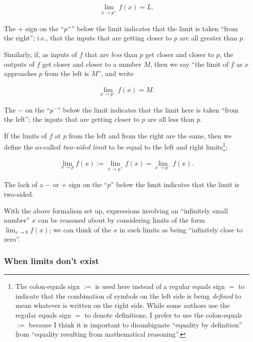 \begin{align*}
    \lim_{x \rightarrow p^+} f(x) = L.
\end{align*}

The $+$ sign on the ``$p^+$'' below the limit indicates that the limit is taken ``from the right''; i.e., that the inputs that are getting closer to $p$ are all greater than $p$.

Similarly, if, as inputs of $f$ that are \textit{less} than $p$ get closer and closer to $p$, the outputs of $f$ get closer and closer to a number $M$, then we say ``the limit of $f$ as $x$ approaches $p$ from the left is $M$'', and write

\begin{align*}
    \lim_{x \rightarrow p^-} f(x) = M.
\end{align*}

The $-$ on the ``$p^-$'' below the limit indicates that the limit here is taken ``from the left''; the inputs that are getting closer to $p$ are all less than $p$.

If the limits of $f$ at $p$ from the left and from the right are the same, then we define the so-called \textit{two-sided limit} to be equal to the left and right limits\footnote{The colon-equals sign $:=$ is used here instead of a regular equals sign $=$ to indicate that the combination of symbols on the left side is being \textit{defined} to mean whatever is written on the right side. While some authors use the regular equals sign $=$ to denote definitions, I prefer to use the colon-equals $:=$ because I think it is important to disambiguate ``equality by definition'' from ``equality resulting from mathematical reasoning''.}:

\begin{align*}
    \lim_{x \rightarrow p} f(x) 
    := \lim_{x \rightarrow p^+} f(x) 
    = \lim_{x \rightarrow p^-} f(x).
\end{align*}

The lack of a $-$ or $+ $ sign on the ``$p$'' below the limit indicates that the limit is two-sided.

With the above formalism set up, expressions involving an ``infinitely small number'' $x$ can be reasoned about by considering limits of the form $\lim_{x \rightarrow 0} f(x)$; we can think of the $x$ in such limits as being ``infinitely close to zero''.

\subsubsection*{When limits don't exist}

